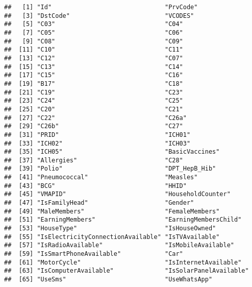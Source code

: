 \documentclass[
]{article}
\begin{document}
\begin{verbatim}
##   [1] "Id"                               "PrvCode"                         
##   [3] "DstCode"                          "VCODES"                          
##   [5] "C03"                              "C04"                             
##   [7] "C05"                              "C06"                             
##   [9] "C08"                              "C09"                             
##  [11] "C10"                              "C11"                             
##  [13] "C12"                              "C07"                             
##  [15] "C13"                              "C14"                             
##  [17] "C15"                              "C16"                             
##  [19] "B17"                              "C18"                             
##  [21] "C19"                              "C23"                             
##  [23] "C24"                              "C25"                             
##  [25] "C20"                              "C21"                             
##  [27] "C22"                              "C26a"                            
##  [29] "C26b"                             "C27"                             
##  [31] "PRID"                             "ICH01"                           
##  [33] "ICH02"                            "ICH03"                           
##  [35] "ICH05"                            "BasicVaccines"                   
##  [37] "Allergies"                        "C28"                             
##  [39] "Polio"                            "DPT_HepB_Hib"                    
##  [41] "Pneumococcal"                     "Measles"                         
##  [43] "BCG"                              "HHID"                            
##  [45] "VMAPID"                           "HouseholdCounter"                
##  [47] "IsFamilyHead"                     "Gender"                          
##  [49] "MaleMembers"                      "FemaleMembers"                   
##  [51] "EarningMembers"                   "EarningMembersChild"             
##  [53] "HouseType"                        "IsHouseOwned"                    
##  [55] "IsElectricityConnectionAvailable" "IsTVAvailable"                   
##  [57] "IsRadioAvailable"                 "IsMobileAvailable"               
##  [59] "IsSmartPhoneAvailable"            "Car"                             
##  [61] "MotorCycle"                       "IsInternetAvailable"             
##  [63] "IsComputerAvailable"              "IsSolarPanelAvailable"           
##  [65] "UseSms"                           "UseWhatsApp"                     

\end{verbatim}
\end{document}
